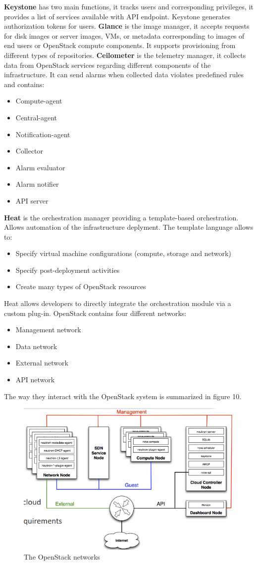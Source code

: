 \textbf{Keystone} has two main functions, it tracks users and corresponding privileges, it provides a list of services available with API endpoint. Keystone generates authorization tokens for users.
\textbf{Glance} is the image manager, it accepts requests for disk images or server images, VMs, or metadata corresponding to images of end users or OpenStack compute components. \n
It supports provisioning from different types of repositories. \n
\textbf{Ceilometer} is the telemetry manager, it collects data from OpenStack services regarding different components of the infrastructure. It can send alarms when collected data violates predefined rules and contains:
\begin{itemize}
    \item Compute-agent
    \item Central-agent
    \item Notification-agent
    \item Collector
    \item Alarm evaluator
    \item Alarm notifier
    \item API server
\end{itemize}
\textbf{Heat} is the orchestration manager providing a template-based orchestration. Allows automation of the infrastructure deplyment. The template language allows to:
\begin{itemize}
    \item Specify virtual machine configurations (compute, storage and network)
    \item Specify post-deployment activities
    \item Create many types of OpenStack resources
\end{itemize}
Heat allows developers to directly integrate the orchestration module via a custom plug-in. \n
OpenStack contains four different networks:
\begin{itemize}
    \item Management network
    \item Data network
    \item External network
    \item API network
\end{itemize}
The way they interact with the OpenStack system is summarized in figure 10.
\begin{figure}
    \centering
    \includegraphics[scale=0.5]{img/OpenStack_network.png}
    \caption{The OpenStack networks}
\end{figure}